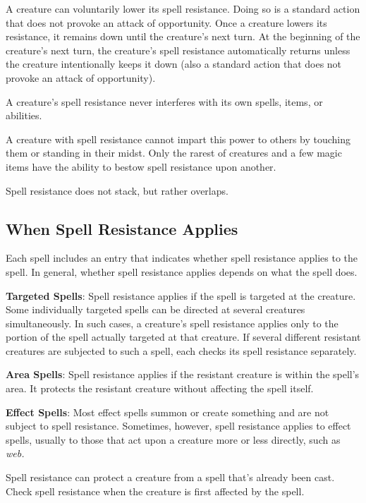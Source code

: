 A creature can voluntarily lower its spell resistance. Doing so is a standard action that does not provoke an attack of opportunity. Once a creature lowers its resistance, it remains down until the creature's next turn. At the beginning of the creature's next turn, the creature's spell resistance automatically returns unless the creature intentionally keeps it down (also a standard action that does not provoke an attack of opportunity).
				
A creature's spell resistance never interferes with its own spells, items, or abilities.
				
A creature with spell resistance cannot impart this power to others by touching them or standing in their midst. Only the rarest of creatures and a few magic items have the ability to bestow spell resistance upon another.
				
Spell resistance does not stack, but rather overlaps. 
				
\subsection{When Spell Resistance Applies}

				
Each spell includes an entry that indicates whether spell resistance applies to the spell. In general, whether spell resistance applies depends on what the spell does.
				
\textbf{Targeted Spells}: Spell resistance applies if the spell is targeted at the creature. Some individually targeted spells can be directed at several creatures simultaneously. In such cases, a creature's spell resistance applies only to the portion of the spell actually targeted at that creature. If several different resistant creatures are subjected to such a spell, each checks its spell resistance separately.
				
\textbf{Area Spells}: Spell resistance applies if the resistant creature is within the spell's area. It protects the resistant creature without affecting the spell itself.
				
\textbf{Effect Spells}: Most effect spells summon or create something and are not subject to spell resistance. Sometimes, however, spell resistance applies to effect spells, usually to those that act upon a creature more or less directly, such as \textit{web.}
				
Spell resistance can protect a creature from a spell that's already been cast. Check spell resistance when the creature is first affected by the spell.
				
